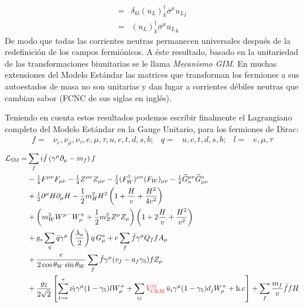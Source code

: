 \begin{frame}
\begin{align}
  =&\delta_{kl}(u_L)^{\dagger}_k \overline{\sigma}^\mu{u_L}_l\nonumber\\
  =&(u_L)^{\dagger}_k\overline{\sigma}^\mu {u_L}_k
 \end{align}
De modo que todas las corrientes neutras permanecen universales después de la redefinición de los campos fermiónicos. A éste resultado, basado en la unitariedad de las transformaciones biunitarias se le llama \emph{Mecanismo GIM}. En muchas extensiones del Modelo Estándar las matrices que transforman los fermiones a sus autoestados de masa no son unitarias y dan lugar a corrientes débiles neutras que cambian sabor (FCNC de sus siglas en inglés). 


Teniendo en cuenta estos resultados podemos escribir finalmente el Lagrangiano completo del Modelo Estándar en la Gauge Unitario, para los fermiones de Dirac:
\begin{align}
  f=&\nu_e,\nu_\mu,\nu_\tau,e,\mu,\tau,u,c,t,d,s,b;&q=&u,c,t,d,s,b;&l=&e,\mu,\tau
\end{align}
\begin{align}
   \mathcal{L}_{\text{SM}}=&\sum_f i\bar{f}\left(\gamma^\mu\partial_\mu-m_f\right)f\nonumber\\
&-\tfrac{1}{4}F^{\mu\nu} F_{\mu\nu}-\tfrac{1}{4}Z^{\mu\nu} Z_{\mu\nu}-\tfrac{1}{2}(F_W^\dagger)^{\mu\nu} (F_W)_{\mu\nu}
- \tfrac{1}{4}\widetilde{G}^{\mu\nu}_a \widetilde{G}_{\mu\nu}^a\nonumber\\
&+\tfrac{1}{2}\partial^\mu H\partial_\mu H
-\frac{1}{2}m_H^2H^2\left(1+\frac{H}{v}+\frac{H^2}{4v^2}\right)\nonumber\\
&+\left(m_W^2{W^\mu}^-W_\mu^++\frac{1}{2}m_Z^2Z^\mu Z_\mu\right)\left(1+2\frac{H}{v}+\frac{H^2}{v^2}\right)\nonumber\\
&+g_s\sum_q\bar{q}\gamma^\mu\left(\frac{\lambda_a}{2}\right)q\,G_\mu^a+e\sum_f \bar{f}\gamma^\mu Q_f f A_\mu\nonumber\\
&+\frac{e}{2\cos\theta_W\sin\theta_W}\sum_{f}\bar{f}\gamma^\mu(v_f-a_f\gamma_5)f Z_\mu\nonumber\\
&+\frac{g_2}{2\sqrt{2}}\left[\sum_{l=e}^{\tau}\bar{\nu_l}\gamma^\mu(1-\gamma_5)l W_\mu^++\sum_{ij}{\color{red}V^{ij}_{\text{CKM}}}\,\bar{u}_i\gamma^\mu(1-\gamma_5)d_j W_\mu^++\text{h.c}\right]
+\sum_f \frac{m_f}{v} \bar{f}f H\nonumber\\

\end{align}
\end{frame}
